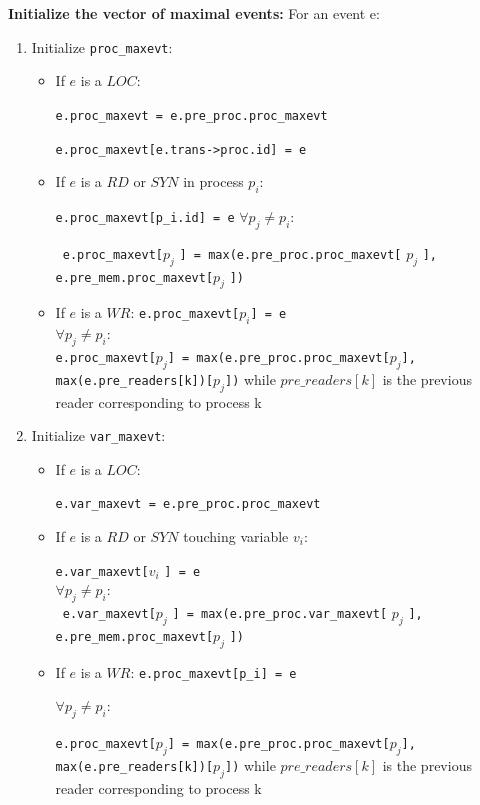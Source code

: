 \documentclass{llncs}
\begin{document}
\noindent
\textbf{Initialize the vector of maximal events:}
For an event e:
\begin{enumerate}
\item {Initialize \verb!proc_maxevt!:}
\begin{itemize}
	\item
		If $e$ is a $LOC$:
		
		\verb!e.proc_maxevt = e.pre_proc.proc_maxevt!
			
		\verb!e.proc_maxevt[e.trans->proc.id] = e!
		
	\item
		If $e$ is a $RD$ or $SYN$ in process $p_i$: 
		
		\verb!e.proc_maxevt[p_i.id] = e!
		$\forall p_j \neq p_i$: 
		
		\verb! e.proc_maxevt[!$p_j$ \verb!] = max(e.pre_proc.proc_maxevt[! $p_j$ \verb!], e.pre_mem.proc_maxevt[!$p_j$ \verb!])!

	\item
		If $e$ is a $WR$: 
		\verb!e.proc_maxevt[!$p_i$\verb!] = e! \\
		$\forall p_j \neq p_i$: \\
		\verb!e.proc_maxevt[!$p_j$\verb!] = max(e.pre_proc.proc_maxevt[!$p_j$\verb!], max(e.pre_readers[k])[!$p_j$\verb!])!
		while $pre\_readers[k]$ is the previous reader corresponding to process k 
\end{itemize}

\item {Initialize \verb!var_maxevt!:}
\begin{itemize}
	\item
		If $e$ is a $LOC$:
		
		\verb!e.var_maxevt = e.pre_proc.proc_maxevt!
	\item
		If $e$ is a $RD$ or $SYN$ touching variable $v_i$: 
		
		\verb!e.var_maxevt[!$v_i$ \verb!] = e!\\
		$\forall p_j \neq p_i$: \\
		\verb! e.var_maxevt[!$p_j$ \verb!] = max(e.pre_proc.var_maxevt[! $p_j$ \verb!], e.pre_mem.proc_maxevt[!$p_j$ \verb!])!

	\item
		If $e$ is a $WR$: 
		\verb!e.proc_maxevt[p_i] = e!

		$\forall p_j \neq p_i$:
			
		\verb!e.proc_maxevt[!$p_j$\verb!] = max(e.pre_proc.proc_maxevt[!$p_j$\verb!], max(e.pre_readers[k])[!$p_j$\verb!])!
		while $pre\_readers[k]$ is the previous reader corresponding to process k 
\end{itemize}	
\end{enumerate}
\end{document}
